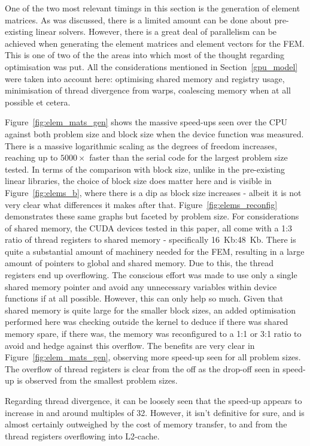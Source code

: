 One of the two most relevant timings in this section is the generation of element matrices. As was discussed, there is a limited amount can be done about pre-existing linear solvers. However, there is a great deal of parallelism can be achieved when generating the element matrices and element vectors for the FEM. This is one of two of the the areas into which most of the thought regarding optimisation was put. All the considerations mentioned in Section~\ref{gpu_model} were taken into account here: optimising shared memory and registry usage, minimisation of thread divergence from warps, coalescing memory when at all possible et cetera.

Figure~\ref{fig:elem_mats_gen} shows the massive speed-ups seen over the CPU against both problem size and block size when the device function was measured. There is a massive logarithmic scaling as the degrees of freedom increases, reaching up to $5000\times$ faster than the serial code for the largest problem size tested. In terms of the comparison with block size, unlike in the pre-existing linear libraries, the choice of block size does matter here and is visible in Figure~\ref{fig:elems_b}, where there is a dip as block size increases - albeit it is not very clear what differences it makes after that. Figure~\ref{fig:elems_reconfig} demonstrates these same graphs but faceted by problem size. For considerations of shared memory, the CUDA devices tested in this paper, all come with a 1:3 ratio of thread registers to shared memory - specifically 16~Kb:48~Kb. There is quite a substantial amount of machinery needed for the FEM, resulting in a large amount of pointers to global and shared memory. Due to this, the thread registers end up overflowing. The conscious effort was made to use only a single shared memory pointer and avoid any unnecessary variables within device functions if at all possible. However, this can only help so much. Given that shared memory is quite large for the smaller block sizes, an added optimisation performed here was checking outside the kernel to deduce if there was shared memory spare, if there was, the memory was reconfigured to a 1:1 or 3:1 ratio to avoid and hedge against this overflow. The benefits are very clear in Figure~\ref{fig:elem_mats_gen}, observing more speed-up seen for all problem sizes. The overflow of thread registers is clear from the off as the drop-off seen in speed-up is observed from the smallest problem sizes.

Regarding thread divergence, it can be loosely seen that the speed-up appears to increase in and around multiples of 32. However, it isn't definitive for sure, and is almost certainly outweighed by the cost of memory transfer, to and from the thread registers overflowing into L2-cache.


